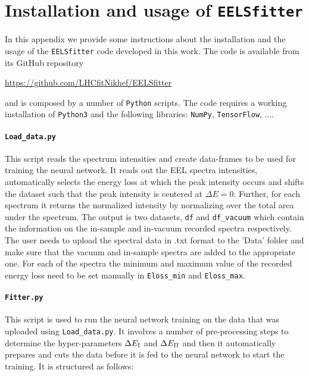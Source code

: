 
\section{Installation and usage of {\tt EELSfitter}}
\label{sec:installation}

In this appendix we provide some instructions about the installation
and the usage of the {\tt EELSfitter} code developed
in this work.
%
The code is available from its GitHub repository
\begin{center}
\url{https://github.com/LHCfitNikhef/EELSfitter}
\end{center}
and is composed by a number of {\tt Python} scripts.
%
The code requires a working installation of {\tt Python3} and the following
libraries: {\tt NumPy}, {\tt TensorFlow}, ....

\noindent
\paragraph{\tt Load\_data.py}
%
This script reads the spectrum
intensities and create data-frames to be used for training the neural network.
%
It reads out the EEL spectra intensities, automatically selects the energy loss
at which the peak intensity occurs and shifts the dataset such that
the peak intensity is centered at $\Delta E =$0. 
%
Further, for each spectrum it returns the normalized intensity by normalizing
over the total area under the spectrum. 
%
The output is two datasets, {\tt df} and {\tt df\_vacuum} which contain the 
information on the in-sample and in-vacuum recorded spectra respectively. 
%
The user needs to upload the spectral data in .txt format to the 'Data' folder
and make sure that the vacuum and in-sample spectra are added to the appropriate one.
%
For each of the spectra the minimum and maximum value of the recorded energy 
loss need to be set manually in {\tt Eloss\_min} and {\tt Eloss\_max}.

\noindent
\paragraph{\tt Fitter.py}
%
This script is used to run the neural network training on the data that was 
uploaded using {\tt Load\_data.py}.
%
It involves a number of pre-processing steps to determine the hyper-parameters $\Delta E_{\rm I}$
and $\Delta E_{\rm II}$ and then
it automatically prepares and cuts the data before it is fed
to the neural network to start the training.
%
It is structured as follows:

